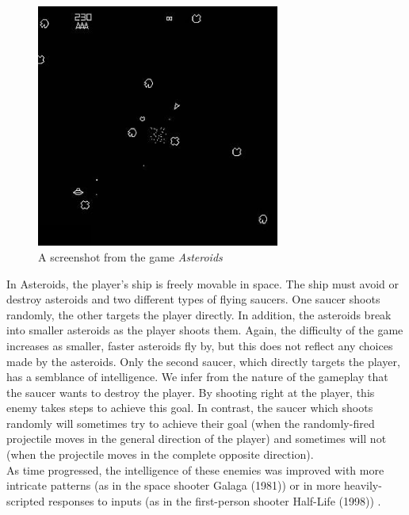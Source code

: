 \begin{figure}[H]
  \centering
  \includegraphics[width=8cm]{figures/Asteroids.jpg}
  \caption{A screenshot from the game \textit{Asteroids}}
  \label{fig:Asteroids}
\end{figure}

In Asteroids, the player's ship is freely movable in space. The ship must avoid or destroy asteroids and two different types of flying saucers. One saucer shoots randomly, the other targets the player directly. In addition, the asteroids break into smaller asteroids as the player shoots them. Again, the difficulty of the game increases as smaller, faster asteroids fly by, but this does not reflect any choices made by the asteroids. Only the second saucer, which directly targets the player, has a semblance of intelligence. We infer from the nature of the gameplay that the saucer wants to destroy the player. By shooting right at the player, this enemy takes steps to achieve this goal. In contrast, the saucer which shoots randomly will sometimes try to achieve their goal (when the randomly-fired projectile moves in the general direction of the player) and sometimes will not (when the projectile moves in the complete opposite direction).\\

As time progressed, the intelligence of these enemies was improved with more intricate patterns (as in the space shooter Galaga (1981)) or in more heavily-scripted responses to inputs (as in the first-person shooter Half-Life (1998)) \cite{schw04}.

